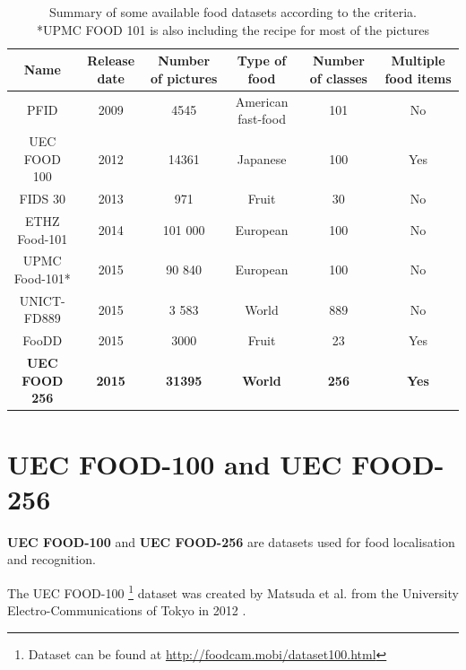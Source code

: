 \begin{table}
    \renewcommand{\arraystretch}{1.1} %
    \begin{tabulary}{\textwidth}{| c | C | C | C | C | C|}
        \hline
        Name & Release date & Number of pictures & Type of food & Number of classes & Multiple food items \\
        \hline
        PFID \cite{Chen2009} & 2009 & 4545 & American fast-food  & 101 & No \\
        \hline
        UEC FOOD 100 \cite{Matsuda2012a} & 2012 & 14361 & Japanese & 100  & Yes \\
        \hline
        FIDS 30 \cite{FIDS30} & 2013 & 971 & Fruit & 30 & No \\
        \hline
        ETHZ Food-101 \cite{Bossard2014} & 2014 & 101 000 & European & 100 & No \\
        \hline
        UPMC Food-101* \cite{Wang2015} & 2015 & 90 840 & European & 100 & No \\
        \hline
        UNICT-FD889 \cite{Farinella2015} & 2015 & 3 583 & World & 889 & No \\
        \hline
        FooDD \cite{ParisaPouladzadehAbdulsalamYassine2015} & 2015 & 3000 & Fruit & 23 & Yes \\
        \hline
        \textbf{UEC FOOD 256} \cite{Kawano2015} & \textbf{2015} & \textbf{31395} & \textbf{World} & \textbf{256}  & \textbf{Yes} \\ 
        \hline
    \end{tabulary}
    \caption[Summary of some available food datasets according to the criteria]{Summary of some available food datasets according to the criteria. \\
        *UPMC FOOD 101 is also including the recipe for most of the pictures}
    \label{table:dataset_summary}
\end{table}

\section{UEC FOOD-100 and UEC FOOD-256}

\textbf{UEC FOOD-100} and \textbf{UEC FOOD-256} are datasets used for food localisation and recognition.

The UEC FOOD-100 \footnote{Dataset can be found at \url{http://foodcam.mobi/dataset100.html}} dataset was created by Matsuda et al. from the University Electro-Communications of Tokyo in 2012 \cite{Matsuda2012a}.

